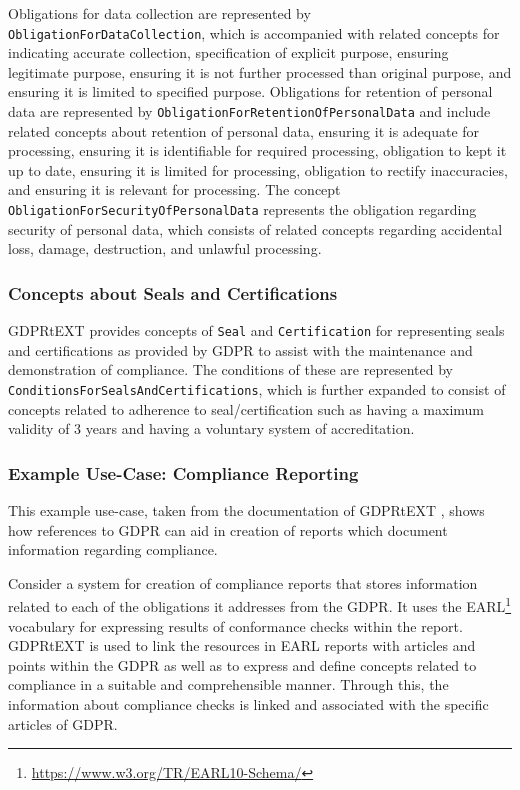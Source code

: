Obligations for data collection are represented by \texttt{ObligationForDataCollection}, which is accompanied with related concepts for indicating accurate collection, specification of explicit purpose, ensuring legitimate purpose, ensuring it is not further processed than original purpose, and ensuring it is limited to specified purpose.
Obligations for retention of personal data are represented by \texttt{ObligationForRetentionOfPersonalData} and include related concepts about    retention of personal data, ensuring it is adequate for processing, ensuring it is identifiable for required processing, obligation to kept it up to date, ensuring it is limited for processing, obligation to rectify inaccuracies, and ensuring it is relevant for processing. 
The concept \texttt{ObligationForSecurityOfPersonalData} represents the obligation regarding security of personal data, which consists of related concepts regarding accidental loss, damage, destruction, and unlawful processing.

\subsubsection{Concepts about Seals and Certifications}
GDPRtEXT provides concepts of \texttt{Seal} and \texttt{Certification} for representing seals and certifications as provided by GDPR to assist with the maintenance and demonstration of compliance.
The conditions of these are represented by \texttt{ConditionsForSealsAndCertifications}, which is further expanded to consist of concepts related to adherence to seal/certification such as having a maximum validity of 3 years and having a voluntary system of accreditation. 

\subsubsection{Example Use-Case: Compliance Reporting}
This example use-case, taken from the documentation of GDPRtEXT \cite{pandit_gdprtext_2018}, shows how references to GDPR can aid in creation of reports which document information regarding compliance. 

Consider a system for creation of compliance reports that stores information related to each of the obligations it addresses from the GDPR. It uses the EARL\footnote{\url{https://www.w3.org/TR/EARL10-Schema/}} vocabulary for expressing results of conformance checks within the report. GDPRtEXT is used to link the resources in EARL reports with articles and points within the GDPR as well as to express and define concepts related to compliance in a suitable and comprehensible manner. Through this, the information about compliance checks is linked and associated with the specific articles of GDPR.

